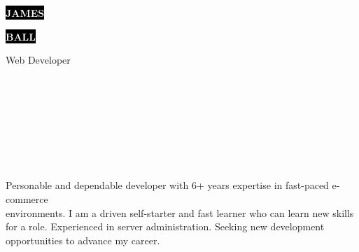 \documentclass[9pt]{cv}
\begin{document}

\begin{minipage}[t]{0.45\textwidth}
	\vspace{-\baselineskip}

	\colorbox{black}{{\HUGE\textcolor{white}{\textbf{\MakeUppercase{James}}}}}
	
	\colorbox{black}{{\HUGE\textcolor{white}{\textbf{\MakeUppercase{Ball}}}}}
	
	\vspace{6pt}
	
	{\huge Web Developer}
\end{minipage}
\begin{minipage}[t]{0.275\textwidth}
	\vspace{-\baselineskip}

	\\

	\\

	\\	
\end{minipage}
\begin{minipage}[t]{0.275\textwidth}
	\vspace{-\baselineskip}

	\\

	\\

    \\    
\end{minipage}

\vspace{0.5cm}



\begin{minipage}[t]{0.4\textwidth}
	\vspace{-\baselineskip}
	
	Personable and dependable developer with 6+ years expertise in fast-paced e-commerce\\
	environments. I am a driven self-starter and fast learner who can learn new skills for a role. Experienced in server administration. Seeking new development opportunities to advance my career.
\end{minipage}
\hfill
\begin{minipage}[t]{0.5\textwidth}
	\vspace{-\baselineskip}
	\begin{barchart}{5.5}
	\end{barchart}
\end{minipage}
\end{document}
